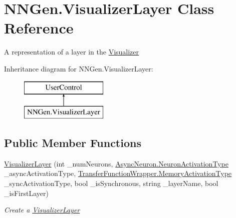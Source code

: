 \hypertarget{class_n_n_gen_1_1_visualizer_layer}{}\section{N\+N\+Gen.\+Visualizer\+Layer Class Reference}
\label{class_n_n_gen_1_1_visualizer_layer}


A representation of a layer in the \hyperlink{class_n_n_gen_1_1_visualizer}{Visualizer}  


Inheritance diagram for N\+N\+Gen.\+Visualizer\+Layer\+:\begin{figure}[H]
\begin{center}
\leavevmode
\includegraphics[height=2.000000cm]{class_n_n_gen_1_1_visualizer_layer}
\end{center}
\end{figure}
\subsection*{Public Member Functions}
\begin{DoxyCompactItemize}
\item 
\hyperlink{class_n_n_gen_1_1_visualizer_layer_a68a8bef64c4066c35865f8f505e6afe7}{Visualizer\+Layer} (int \+\_\+num\+Neurons, \hyperlink{class_n_n_gen_1_1_async_neuron_afe8460a52808d1587cbcc0a8e4e23b64}{Async\+Neuron.\+Neuron\+Activation\+Type} \+\_\+async\+Activation\+Type, \hyperlink{class_n_n_gen_1_1_transfer_function_wrapper_aa338ffadb8fcdf76df75419374a51ff6}{Transfer\+Function\+Wrapper.\+Memory\+Activation\+Type} \+\_\+sync\+Activation\+Type, bool \+\_\+is\+Synchronous, string \+\_\+layer\+Name, bool \+\_\+is\+First\+Layer)
\begin{DoxyCompactList}\small\item\em Create a \hyperlink{class_n_n_gen_1_1_visualizer_layer}{Visualizer\+Layer} \end{DoxyCompactList}\end{DoxyCompactItemize}
